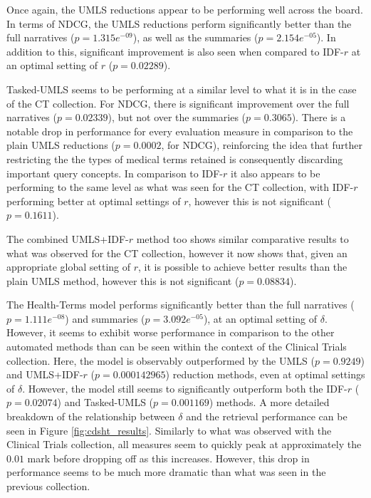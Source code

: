 \documentclass[a4paper]{report}
\begin{document}
Once again, the UMLS reductions appear to be performing well across the board. In terms of NDCG, the UMLS reductions perform significantly better than the full narratives ($p = 1.315e^{-09}$), as well as the summaries ($p=2.154e^{-05}$). In addition to this, significant improvement is also seen when compared to IDF-$r$ at an optimal setting of $r$ ($p=0.02289$).

Tasked-UMLS seems to be performing at a similar level to what it is in the case of the CT collection. For NDCG, there is significant improvement over the full narratives ($p=0.02339$), but not over the summaries ($p=0.3065$). There is a notable drop in performance for every evaluation measure in comparison to the plain UMLS reductions ($p=0.0002$, for NDCG), reinforcing the idea that further restricting the the types of medical terms retained is consequently discarding important query concepts. In comparison to IDF-$r$ it also appears to be performing to the same level as what was seen for the CT collection, with IDF-$r$ performing better at optimal settings of $r$, however this is not significant ($p=0.1611$). 

The combined UMLS+IDF-$r$ method too shows similar comparative results to what was observed for the CT collection, however it now shows that, given an appropriate global setting of $r$, it is possible to achieve better results than the plain UMLS method, however this is not significant ($p=0.08834$).

The Health-Terms model performs significantly better than the full narratives ($p=1.111e^{-08}$) and summaries ($p=3.092e^{-05}$), at an optimal setting of $\delta$. However, it seems to exhibit worse performance in comparison to the other automated methods than can be seen within the context of the Clinical Trials collection. Here, the model  is observably outperformed by the UMLS ($p= 0.9249$) and UMLS+IDF-$r$ ($p=0.000142965$) reduction methods, even at optimal settings of $\delta$. However, the model still seems to significantly outperform both the IDF-$r$ ($p=0.02074$) and Tasked-UMLS ($p=0.001169$) methods. A more detailed breakdown of the relationship between $\delta$ and the retrieval performance can be seen in Figure \ref{fig:cdsht_results}. Similarly to what was observed with the Clinical Trials collection, all measures seem to quickly peak at approximately the $0.01$ mark before dropping off as this increases. However, this drop in performance seems to be much more dramatic than what was seen in the previous collection.
\end{document}
